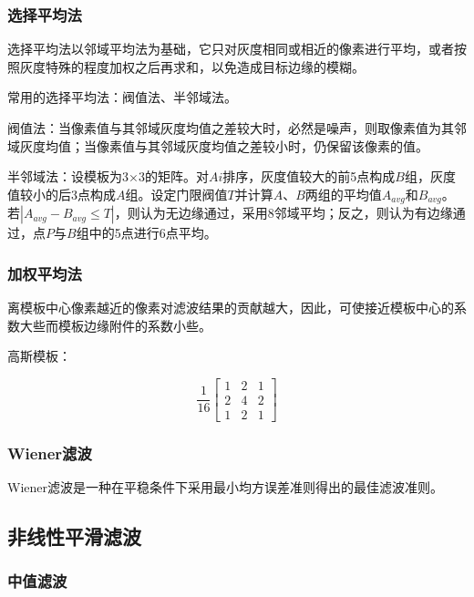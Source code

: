 \documentclass[cn, blue, normal, 12pt]{elegantnote}
\begin{document}
{\subsubsection{选择平均法}

选择平均法以邻域平均法为基础，它只对灰度相同或相近的像素进行平均，或者按照灰度特殊的程度加权之后再求和，以免造成目标边缘的模糊。

常用的选择平均法：阀值法、半邻域法。

阀值法：当像素值与其邻域灰度均值之差较大时，必然是噪声，则取像素值为其邻域灰度均值；当像素值与其邻域灰度均值之差较小时，仍保留该像素的值。

半邻域法：设模板为3×3的矩阵。对$Ai$排序，灰度值较大的前5点构成$B$组，灰度值较小的后3点构成$A$组。设定门限阀值$T$并计算$A$、$B$两组的平均值$A_{avg}$和$B_{avg}$。若$|A_{avg}-B_{avg}\leq T|$，则认为无边缘通过，采用8邻域平均；反之，则认为有边缘通过，点$P$与$B$组中的5点进行6点平均。

\subsubsection{加权平均法}

离模板中心像素越近的像素对滤波结果的贡献越大，因此，可使接近模板中心的系数大些而模板边缘附件的系数小些。

高斯模板：

\begin{equation}
    \frac{1}{16}\left[
        \begin{array}{ccc}
            1 & 2 & 1 \\
            2 & 4 & 2 \\
            1 & 2 & 1
        \end{array}
    \right]
\end{equation}

\subsubsection{Wiener滤波}

Wiener滤波是一种在平稳条件下采用最小均方误差准则得出的最佳滤波准则。

\subsection{非线性平滑滤波}

\subsubsection{中值滤波}

}
\end{document}
